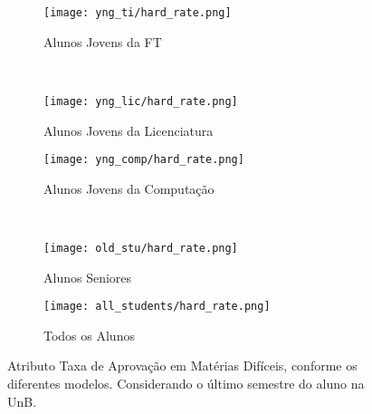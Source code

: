 \clearpage
\begin{figure}[!ht]
    \centering
    \begin{subfigure}[b]{0.48\textwidth}
        \centering
        \texttt{[image: yng\_ti/hard\_rate.png]}
        \caption{Alunos Jovens da FT}
    \end{subfigure}
    ~
    \begin{subfigure}[b]{0.48\textwidth}
        \centering
        \texttt{[image: yng\_lic/hard\_rate.png]}
        \caption{Alunos Jovens da Licenciatura}
    \end{subfigure}

    \begin{subfigure}[b]{0.48\textwidth}
        \centering
        \texttt{[image: yng\_comp/hard\_rate.png]}
        \caption{Alunos Jovens da Computação}
    \end{subfigure}
    ~
    \begin{subfigure}[b]{0.48\textwidth}
        \centering
        \texttt{[image: old\_stu/hard\_rate.png]}
        \caption{Alunos Seniores}
    \end{subfigure}

    \begin{subfigure}[b]{0.48\textwidth}
        \centering
        \texttt{[image: all\_students/hard\_rate.png]}
        \caption{Todos os Alunos}
    \end{subfigure}
    \caption{Atributo Taxa de Aprovação em Matérias Difíceis, conforme os diferentes
    modelos. Considerando o último semestre do aluno na UnB.}
\end{figure}

